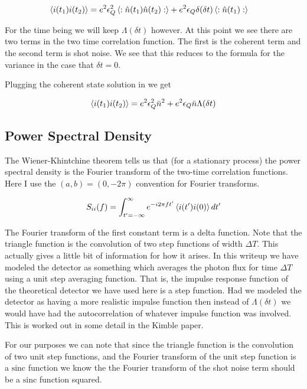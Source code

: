 \documentclass[12pt]{article}
\newcommand{\ep}{\epsilon}
\newcommand{\sinc}{\text{sinc}}
\begin{document}
\begin{align}
\Braket{i(t_1)i(t_2)} &=e^2 \ep_Q^2 \Braket{:\hat{n}(t_1)\hat{n}(t_2):} + e^2 \ep_Q \delta(\delta t) \braket{:\hat{n}(t_1):}
\end{align}

For the time being we will keep $\Lambda(\delta t)$ however. At this point we see there are two terms in the two time correlation function. The first is the coherent term and the second term is shot noise. We see that this reduces to the formula for the variance in the case that $\delta t=0$.

Plugging the coherent state solution in we get

\begin{align}
\braket{i(t_1)i(t_2)} = e^2 \ep_Q^2 \bar{n}^2 + e^2 \ep_Q \bar{n} \Lambda(\delta t)
\end{align}

\subsection{Power Spectral Density}

The Wiener-Khintchine theorem tells us that (for a stationary process) the power spectral density is the Fourier transform of the two-time correlation functions. Here I use the $(a,b) = (0,-2\pi)$ convention for Fourier transforms.

\begin{align}
S_{ii}(f) = \int_{t'=-\infty}^{\infty} e^{-i2\pi f t'} \Braket{i(t')i(0)} dt'
\end{align}

The Fourier transform of the first constant term is a delta function. 
Note that the triangle function is the convolution of two step functions of width $\Delta T$. This actually gives a little bit of information for how it arises. In this writeup we have modeled the detector as something which averages the photon flux for time $\Delta T$ using a unit step averaging function. That is, the impulse response function of the theoretical detector we have used here is a step function. Had we modeled the detector as having a more realistic impulse function then instead of $\Lambda(\delta t)$ we would have had the autocorrelation of whatever impulse function was involved. This is worked out in some detail in the Kimble paper.

For our purposes we can note that since the triangle function is the convolution of two unit step functions, and the Fourier transform of the unit step function is a $\sinc$ function we know the the Fourier transform of the shot noise term should be a $\sinc$ function squared.
\end{document}

